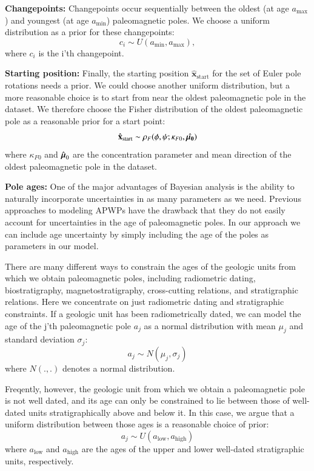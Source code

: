 \documentclass[preprint,12pt,authoryear]{elsarticle}
\newcommand{\mitbf}[1]{\hbox{\mathversion{bold}$#1$}}
\begin{document}
\textbf{Changepoints:} 
Changepoints occur sequentially between the oldest (at age $a_\mathrm{max}$) and
youngest (at age $a_\mathrm{min}$) paleomagnetic poles.
We choose a uniform distribution as a prior for these changepoints:
\begin{equation}
c_i \sim U( a_\mathrm{min}, a_\mathrm{max}),
\end{equation}
where $c_i$ is the i'th changepoint.

\textbf{Starting position:}
Finally, the starting position $\hat{\mathbf{x}}_\mathrm{start}$ for the set of Euler pole rotations needs a prior.
We could choose another uniform distribution, but a more reasonable choice
is to start from near the oldest paleomagnetic pole in the dataset.
We therefore choose the Fisher distribution of the oldest paleomagnetic pole as a reasonable prior for a start point:
\begin{equation}
\hat{\mathbf{x}}_\mathrm{start} \sim \rho_F(\phi, \psi; \kappa_{F0}, \hat{\mitbf{\mu_0}})
\end{equation}
where $\kappa_{F0}$ and $\hat{\mitbf{\mu}}_0$ are the concentration parameter and mean direction
of the oldest paleomagnetic pole in the dataset.

\textbf{Pole ages:}
One of the major advantages of Bayesian analysis is the ability to naturally incorporate
uncertainties in as many parameters as we need. Previous approaches to
modeling APWPs have the drawback that they do not easily account for uncertainties in
the age of paleomagnetic poles. In our approach we can include age uncertainty
by simply including the age of the poles as parameters in our model.

There are many different ways to constrain the ages of the geologic units from
which we obtain paleomagnetic poles, including radiometric dating, biostratigraphy,
magnetostratigraphy, cross-cutting relations, and stratigraphic relations.
Here we concentrate on just radiometric dating and stratigraphic constraints.
If a geologic unit has been radiometrically dated, we can model the age of
the j'th paleomagnetic pole $a_j$ as a normal distribution with mean $\mu_j$ and standard deviation $\sigma_j$:
\begin{equation}
a_j \sim N(\mu_j, \sigma_j)
\end{equation}
where $N(.,.)$ denotes a normal distribution.

Freqently, however, the geologic unit from which we obtain a paleomagnetic pole
is not well dated, and its age can only be constrained to lie between those
of well-dated units stratigraphically above and below it. In this case,
we argue that a uniform distribution between those ages is a reasonable choice
of prior:
\begin{equation}
a_j \sim U(a_\mathrm{low}, a_\mathrm{high})
\end{equation}
where $a_\mathrm{low}$ and $a_\mathrm{high}$ are the ages of the upper and lower
well-dated stratigraphic units, respectively.
\end{document}
